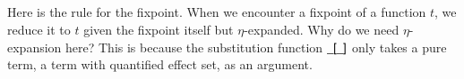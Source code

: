 \documentclass[a4paper,11pt]{article}
\newcommand\fun[1]{{\AgdaFunction{#1}}}
\begin{document}
\begin{AgdaAlign}
\begin{code}
\AgdaSpace{}%
\AgdaSymbol{\}}\AgdaSpace{}%
\AgdaSymbol{\{}\AgdaSpace{}%
\AgdaSymbol{\}}\<%
\\
\>[4][@{}l@{\AgdaIndent{0}}]%
\>[6]\AgdaSpace{}%
\AgdaSymbol{(}\AgdaSpace{}%
\AgdaSymbol{:}\AgdaSpace{}%
\AgdaSymbol{(}\AgdaSpace{}%
\AgdaOperator{\AgdaInductiveConstructor{!}}\AgdaSpace{}%
\AgdaSymbol{)}\AgdaSpace{}%
\AgdaSpace{}%
\AgdaSymbol{)}\<%
\\
%
\>[6]\AgdaSpace{}%
\AgdaSymbol{(}\AgdaSpace{}%
\AgdaSymbol{:}\AgdaSpace{}%
\AgdaSpace{}%
\AgdaSymbol{)}\<%
\\
%
\>[6]\AgdaSpace{}%
\AgdaSymbol{\{}\AgdaSpace{}%
\AgdaSymbol{:}\AgdaSpace{}%
\AgdaSpace{}%
\AgdaSpace{}%
\AgdaSpace{}%
\AgdaSpace{}%
\AgdaSpace{}%
\AgdaSymbol{\}}\<%
\\
%
\>[6]\AgdaSpace{}%
\AgdaSpace{}%
\AgdaSpace{}%
\AgdaSpace{}%
\AgdaSpace{}%
\AgdaSpace{}%
\AgdaSpace{}%
\AgdaSpace{}%
\AgdaOperator{\AgdaFunction{[}}\AgdaSpace{}%
\AgdaSpace{}%
\AgdaSpace{}%
\AgdaSymbol{((}\AgdaSpace{}%
\AgdaSpace{}%
\AgdaSymbol{)}\AgdaSpace{}%
\AgdaSpace{}%
\AgdaSpace{}%
\AgdaSpace{}%
\AgdaSymbol{)}\AgdaSpace{}%
\AgdaSymbol{(}\AgdaSpace{}%
\AgdaSpace{}%
\AgdaSymbol{)}\AgdaSpace{}%
\AgdaOperator{\AgdaFunction{]}}\AgdaSpace{}%
\AgdaOperator{\AgdaFunction{[}}\AgdaSpace{}%
\AgdaSpace{}%
\AgdaSpace{}%
\AgdaOperator{\AgdaFunction{]}}\<%
\end{code}
Here is the rule for the fixpoint. When we encounter a fixpoint of a function $t$, we reduce it to $t$ given
the fixpoint itself but $\eta$-expanded. Why do we need $\eta$-expansion here? This is because the substitution function $\fun{\_[\_]}$ only takes a pure term, a term with quantified effect set, as an argument.

\end{AgdaAlign}
\end{document}
